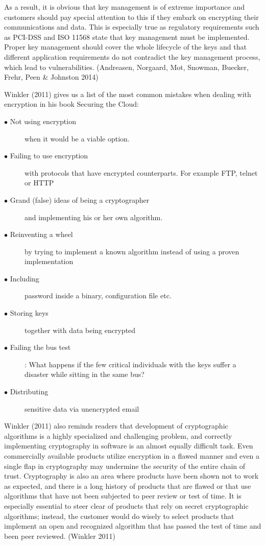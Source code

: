 \documentclass{article}
\begin{document}
\par
As a result, it is obvious that key management is of extreme importance and customers should pay special attention to this if they embark on encrypting their communications and data. This is especially true as regulatory requirements such as PCI-DSS and ISO 11568 state that key management must be implemented. Proper key management should cover the whole lifecycle of the keys and that different application requirements do not contradict the key management process, which lead to vulnerabilities. (Andreasen, Norgaard, Mot, Snowman, Buecker, Frehr, Peen \& Johnston 2014)
\par
Winkler (2011) gives us a list of the most common mistakes when dealing with encryption in his book Securing the Cloud:
\begin{description}
	\item[$\bullet$ Not using encryption] when it would be a viable option.
	\item[$\bullet$ Failing to use encryption] with protocols that have encrypted counterparts. For example FTP, telnet or HTTP 
	\item[$\bullet$ Grand (false) ideas of being a cryptographer] and implementing his or her own algorithm. 
	\item[$\bullet$ Reinventing a wheel] by trying to implement a known algorithm instead of using a proven implementation
	\item[$\bullet$ Including] password inside a binary, configuration file etc.
	\item[$\bullet$ Storing keys] together with data being encrypted
	\item[$\bullet$ Failing the bus test]: What happens if the few critical individuals with the keys suffer a disaster while sitting in the same bus? 
	\item[$\bullet$ Distributing] sensitive data via unencrypted email
\end{description} 
Winkler (2011) also reminds readers that development of cryptographic algorithms is a highly specialized and challenging problem, and correctly implementing cryptography in software is an almost equally difficult task. Even commercially available products utilize encryption in a flawed manner and even a single flap in cryptography may undermine the security of the entire chain of trust. Cryptography is also an area where products have been shown not to work as expected, and there is a long history of products that are flawed or that use algorithms that have not been subjected to peer review or test of time. It is especially essential to steer clear of products that rely on secret cryptographic algorithms; instead, the customer would do wisely to select products that implement an open and recognized algorithm that has passed the test of time and been peer reviewed. (Winkler 2011)
\end{document}
